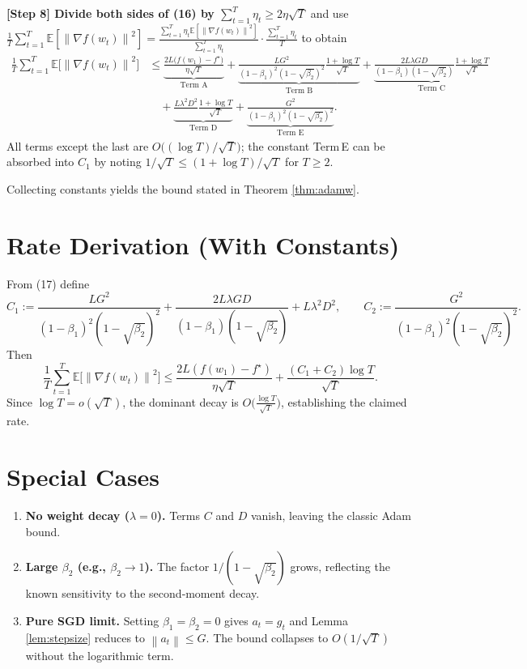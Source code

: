 \documentclass{article}
\newcommand{\EE}{\mathbb{E}}
\newcommand{\norm}[1]{\left\|#1\right\|}
\begin{document}
\medskip
\noindent\textbf{[Step 8] Divide both sides of (16) by $\sum_{t=1}^{T}\eta_t\ge 2\eta\sqrt{T}$}
and use $\frac{1}{T}\sum_{t=1}^{T}\EE[\norm{\nabla f(w_t)}^{2}]
   =\frac{\sum_{t=1}^{T}\eta_t\EE[\norm{\nabla f(w_t)}^{2}]}{\sum_{t=1}^{T}\eta_t}\cdot\frac{\sum_{t=1}^{T}\eta_t}{T}$
to obtain
\begin{align}
    \frac{1}{T}\sum_{t=1}^{T}\EE\!\bigl[\norm{\nabla f(w_t)}^{2}\bigr]
    &\le
      \underbrace{\frac{2L\bigl(f(w_1)-f^\star\bigr)}{\eta\sqrt{T}}}_{\text{Term A}}
      +\underbrace{\frac{L G^{2}}{(1-\beta_1)^{2}(1-\sqrt{\beta_2})^{2}}
                \frac{1+\log T}{\sqrt{T}}}_{\text{Term B}}
      +\underbrace{\frac{2L\lambda G D}{(1-\beta_1)(1-\sqrt{\beta_2})}
                \frac{1+\log T}{\sqrt{T}}}_{\text{Term C}} \nonumber\\
    &\quad +\underbrace{\frac{L\lambda^{2} D^{2}}{ }\frac{1+\log T}{\sqrt{T}}}_{\text{Term D}}
      +\underbrace{\frac{G^{2}}{(1-\beta_1)^{2}(1-\sqrt{\beta_2})^{2}}}_{\text{Term E}} . \tag{17}
\end{align}
All terms except the last are $O\bigl((\log T)/\sqrt{T}\bigr)$; the constant Term E can be absorbed into $C_1$ by noting $1/\sqrt{T}\le (1+\log T)/\sqrt{T}$ for $T\ge 2$.

Collecting constants yields the bound stated in Theorem \ref{thm:adamw}.

\hfill\qedsymbol

\section*{Rate Derivation (With Constants)}
From (17) define
\[
    C_1:=\frac{L G^{2}}{(1-\beta_1)^{2}(1-\sqrt{\beta_2})^{2}}
          +\frac{2L\lambda G D}{(1-\beta_1)(1-\sqrt{\beta_2})}
          +L\lambda^{2} D^{2},
\qquad
    C_2:=\frac{G^{2}}{(1-\beta_1)^{2}(1-\sqrt{\beta_2})^{2}} .
\]
Then
\[
    \frac{1}{T}\sum_{t=1}^{T}\EE\!\bigl[\norm{\nabla f(w_t)}^{2}\bigr]
    \le \frac{2L(f(w_1)-f^\star)}{\eta\sqrt{T}}
          +\frac{(C_1+C_2)\log T}{\sqrt{T}} .
\]
Since $\log T=o(\sqrt{T})$, the dominant decay is $O\!\bigl(\frac{\log T}{\sqrt{T}}\bigr)$, establishing the claimed rate.

\section*{Special Cases}
\begin{enumerate}[label=\arabic*.]
\item \textbf{No weight decay ($\lambda=0$).}  Terms $C$ and $D$ vanish, leaving the classic Adam bound.
\item \textbf{Large $\beta_2$ (e.g., $\beta_2\to1$).}  The factor $1/(1-\sqrt{\beta_2})$ grows, reflecting the known sensitivity to the second‑moment decay.
\item \textbf{Pure SGD limit.}  Setting $\beta_1=\beta_2=0$ gives $a_t=g_t$ and Lemma \ref{lem:stepsize} reduces to $\norm{a_t}\le G$. The bound collapses to $O(1/\sqrt{T})$ without the logarithmic term.
\end{enumerate}
\end{document}
